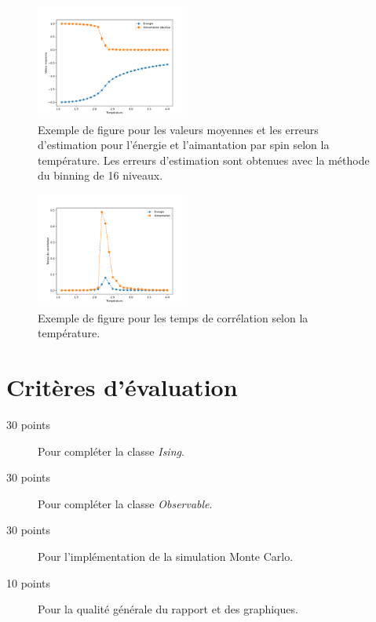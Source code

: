\documentclass{article}
\begin{document}
\begin{figure}[h]
    \begin{center}
        \includegraphics[width=0.45\textwidth]{./energie_aimantation.pdf}
    \end{center}
    \caption{
        Exemple de figure pour les valeurs moyennes et les erreurs d'estimation
        pour l'énergie et l'aimantation par spin selon la température.
        Les erreurs d'estimation sont obtenues avec la méthode du binning de 16 niveaux.
    }
    \label{fig:moyennes}
\end{figure}

\begin{figure}[h]
    \begin{center}
        \includegraphics[width=0.45\textwidth]{./temps_correlation.pdf}
    \end{center}
    \caption{
        Exemple de figure pour les temps de corrélation selon la température.
    }
    \label{fig:correlation}
\end{figure}


\section{Critères d'évaluation}

\begin{description}
    \item[30 points] Pour compléter la classe \textit{Ising}.
    \item[30 points] Pour compléter la classe \textit{Observable}.
    \item[30 points] Pour l'implémentation de la simulation Monte Carlo.
    \item[10 points] Pour la qualité générale du rapport et des graphiques.
\end{description}
\end{document}
